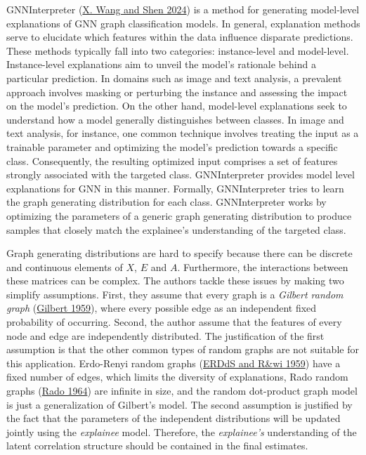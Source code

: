 \documentclass[
  11pt,
  letterpaper,
]{article}
\begin{document}
\quad GNNInterpreter (\protect\hyperlink{ref-Wang_Shen_2024}{X. Wang and
Shen 2024}) is a method for generating model-level explanations of GNN
graph classification models. In general, explanation methods serve to
elucidate which features within the data influence disparate
predictions. These methods typically fall into two categories:
instance-level and model-level. Instance-level explanations aim to
unveil the model's rationale behind a particular prediction. In domains
such as image and text analysis, a prevalent approach involves masking
or perturbing the instance and assessing the impact on the model's
prediction. On the other hand, model-level explanations seek to
understand how a model generally distinguishes between classes. In image
and text analysis, for instance, one common technique involves treating
the input as a trainable parameter and optimizing the model's prediction
towards a specific class. Consequently, the resulting optimized input
comprises a set of features strongly associated with the targeted class.
GNNInterpreter provides model level explanations for GNN in this manner.
Formally, GNNInterpreter tries to learn the graph generating
distribution for each class. GNNInterpreter works by optimizing the
parameters of a generic graph generating distribution to produce samples
that closely match the explainee's understanding of the targeted class.

\quad Graph generating distributions are hard to specify because there
can be discrete and continuous elements of \(X\), \(E\) and \(A\).
Furthermore, the interactions between these matrices can be complex. The
authors tackle these issues by making two simplify assumptions. First,
they assume that every graph is a \emph{Gilbert random graph}
(\protect\hyperlink{ref-Gilbert_1959}{Gilbert 1959}), where every
possible edge as an independent fixed probability of occurring. Second,
the author assume that the features of every node and edge are
independently distributed. The justification of the first assumption is
that the other common types of random graphs are not suitable for this
application. Erdo-Renyi random graphs
(\protect\hyperlink{ref-erdds1959random}{ERDdS and R\&wi 1959}) have a
fixed number of edges, which limits the diversity of explanations, Rado
random graphs (\protect\hyperlink{ref-Rado1964UniversalGA}{Rado 1964})
are infinite in size, and the random dot-product graph model is just a
generalization of Gilbert's model. The second assumption is justified by
the fact that the parameters of the independent distributions will be
updated jointly using the \emph{explainee} model. Therefore, the
\emph{explainee's} understanding of the latent correlation structure
should be contained in the final estimates.
\end{document}
